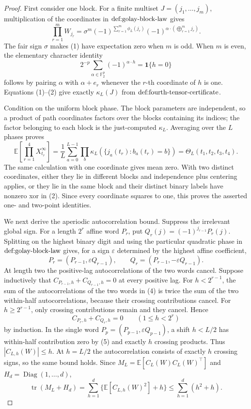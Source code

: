 \documentclass{article}
\begin{document}
\begin{proof}
First consider one block.  For a finite multiset \(J=(j_1,\ldots,j_m)\), multiplication of the coordinates in \(\textnormal{def:golay-block-law}\) gives
\[
\prod_{r=1}^mW_{j_r}
=\sigma^m(-1)^{\sum_{r=1}^m\phi_L(j_r)}
 (-1)^{\alpha\cdot(\bigoplus_{r=1}^m j_r)}. \tag{1}
\]
The fair sign \(\sigma\) makes (1) have expectation zero when \(m\) is odd.  When \(m\) is even, the elementary character identity
\[
2^{-p}\sum_{\alpha\in\mathbb F_2^p}(-1)^{\alpha\cdot h}=\mathbf 1\{h=0\} \tag{2}
\]
follows by pairing \(\alpha\) with \(\alpha+e_r\) whenever the \(r\)-th coordinate of \(h\) is one.  Equations (1)--(2) give exactly \(\kappa_L(J)\) from \(\textnormal{def:fourth-tensor-certificate}\).

Condition on the uniform block phase.  The block parameters are independent, so a product of path coordinates factors over the blocks containing its indices; the factor belonging to each block is the just-computed \(\kappa_L\).  Averaging over the \(L\) phases proves
\[
\mathbb E\!\left[\prod_{r=1}^4X_{t_r}^{\infty}\right]
=\frac1L\sum_{a=0}^{L-1}\prod_b
 \kappa_L\!\left(\{j_a(t_r):b_a(t_r)=b\}\right)
=\Theta_L(t_1,t_2,t_3,t_4). \tag{3}
\]
The same calculation with one coordinate gives mean zero.  With two distinct coordinates, either they lie in different blocks and independence plus centering applies, or they lie in the same block and their distinct binary labels have nonzero xor in (2).  Since every coordinate squares to one, this proves the asserted one- and two-point identities.

We next derive the aperiodic autocorrelation bound.  Suppress the irrelevant global sign.  For a length \(2^r\) affine word \(P_r\), put \(Q_r(j)=(-1)^{j_{r-1}}P_r(j)\).  Splitting on the highest binary digit and using the particular quadratic phase in \(\textnormal{def:golay-block-law}\) gives, for a sign \(\varepsilon\) determined by the highest affine coefficient,
\[
P_r=(P_{r-1},\varepsilon Q_{r-1}),\qquad
Q_r=(P_{r-1},-\varepsilon Q_{r-1}). \tag{4}
\]
At length two the positive-lag autocorrelations of the two words cancel.  Suppose inductively that \(C_{P_{r-1},h}+C_{Q_{r-1},h}=0\) at every positive lag.  For \(h<2^{r-1}\), the sum of the autocorrelations of the two words in (4) is twice the sum of the two within-half autocorrelations, because their crossing contributions cancel.  For \(h\ge 2^{r-1}\), only crossing contributions remain and they cancel.  Hence
\[
C_{P_r,h}+C_{Q_r,h}=0\qquad(1\le h<2^r) \tag{5}
\]
by induction.  In the single word \(P_p=(P_{p-1},\varepsilon Q_{p-1})\), a shift \(h<L/2\) has within-half contribution zero by (5) and exactly \(h\) crossing products.  Thus \(|C_{L,h}(W)|\le h\).  At \(h=L/2\) the autocorrelation consists of exactly \(h\) crossing signs, so the same bound holds.  Since \(M_L=\mathbb E[C_L(W)C_L(W)^{\top}]\) and \(H_d=\operatorname{Diag}(1,\ldots,d)\),
\[
\operatorname{tr}(M_L+H_d)
=\sum_{h=1}^d\{\mathbb E[C_{L,h}(W)^2]+h\}
\le \sum_{h=1}^d(h^2+h). \tag{6}
\]


\end{proof}
\end{document}
